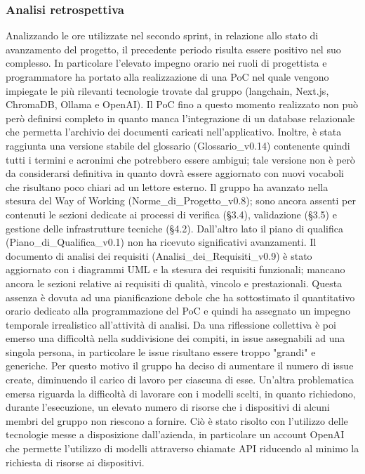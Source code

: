 \newpage
\subsubsection{Analisi retrospettiva}
Analizzando le ore utilizzate nel secondo sprint, in relazione allo stato di avanzamento del progetto, il precedente periodo risulta essere positivo nel suo complesso. In particolare l'elevato impegno orario nei ruoli di progettista e programmatore ha portato alla realizzazione di una PoC nel quale vengono impiegate le più rilevanti tecnologie trovate dal gruppo (langchain, Next.js, ChromaDB, Ollama e OpenAI). Il PoC fino a questo momento realizzato non può però definirsi completo in quanto manca l'integrazione di un database relazionale che permetta l'archivio dei documenti caricati nell'applicativo. Inoltre, è stata raggiunta una versione stabile del glossario (Glossario\_v0.14) contenente quindi tutti i termini e acronimi che potrebbero essere ambigui; tale versione non è però da considerarsi definitiva in quanto dovrà essere aggiornato con nuovi vocaboli che risultano poco chiari ad un lettore esterno. Il gruppo ha avanzato nella stesura del Way of Working (Norme\_di\_Progetto\_v0.8); sono ancora assenti per contenuti le sezioni dedicate ai processi di verifica (§3.4),  validazione (§3.5) e gestione delle infrastrutture tecniche (§4.2). Dall'altro lato il piano di qualifica (Piano\_di\_Qualifica\_v0.1) non ha ricevuto significativi avanzamenti. Il documento di analisi dei requisiti (Analisi\_dei\_Requisiti\_v0.9) è stato aggiornato con i diagrammi UML e la stesura dei requisiti funzionali; mancano ancora le sezioni relative ai requisiti di qualità, vincolo e prestazionali. Questa assenza è dovuta ad una pianificazione debole che ha sottostimato il quantitativo orario dedicato alla programmazione del PoC e quindi ha assegnato un impegno temporale irrealistico all'attività di analisi. Da una riflessione collettiva è poi emerso una difficoltà nella suddivisione dei compiti, in issue assegnabili ad una singola persona, in particolare le issue risultano essere troppo "grandi" e generiche. Per questo motivo il gruppo ha deciso di aumentare il numero di issue create, diminuendo il carico di lavoro per ciascuna di esse. Un'altra problematica emersa riguarda la difficoltà di lavorare con i modelli scelti, in quanto richiedono, durante l'esecuzione, un elevato numero di risorse che i dispositivi di alcuni membri del gruppo non riescono a fornire. Ciò è stato risolto con l'utilizzo delle tecnologie messe a disposizione dall'azienda, in particolare un account OpenAI che permette l'utilizzo di modelli attraverso chiamate API riducendo al minimo la richiesta di risorse ai dispositivi.
\newpage

